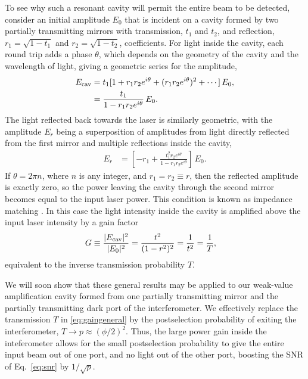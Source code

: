 To see why such a resonant cavity will permit the entire beam to be detected, consider an initial amplitude $E_0$ that is incident on a cavity formed by two partially transmitting mirrors with transmission, $t_1$ and $t_2$, and reflection, $r_1 = \sqrt{1-t_1}$ and $r_2 = \sqrt{1-t_2}$, coefficients.  For light inside the cavity, each round trip adds a phase $\theta$, which depends on the geometry of the cavity and the wavelength of light, giving a geometric series for the amplitude,
\begin{align}\label{eq:simplecavityamplitude}
\nonumber E_{\rm cav}&= t_1[1 + r_1 r_2 e^{i\theta} + (r_1 r_2 e^{i\theta})^2 + \cdots]\,E_0, \\
&=\frac{t_1}{1 - r_1 r_2 e^{i\theta}}\,E_0.
\end{align}   
The light reflected back towards the laser is similarly geometric, with the amplitude $E_r$ being a superposition of amplitudes from light directly reflected from the first mirror and multiple reflections inside the cavity,
\begin{align}\label{eq:simplecavityreflection}
E_{r} &= \left[-r_1 + \frac{t_1^2 r_2 e^{i\theta}}{1 - r_1 r_2 e^{i\theta}}\right]\,E_0.
\end{align}
If $\theta = 2\pi n$, where $n$ is any integer, and $r_1 = r_2 \equiv r$, then the reflected amplitude is exactly zero, so the power leaving the cavity through the second mirror becomes equal to the input laser power.  This condition is known as impedance matching \cite{Schnier1997}.  In this case the light intensity inside the cavity is amplified above the input laser intensity by a gain factor 
\begin{align}\label{eq:gaingeneral}
 G &\equiv \frac{|E_{\rm cav}|^2}{|E_0|^2} = \frac{t^2}{(1 - r^2)^2} = \frac{1}{t^2} = \frac{1}{T},
\end{align}   
equivalent to the inverse transmission probability $T$.  

We will soon show that these general results may be applied to our weak-value amplification cavity formed from one partially transmitting mirror and the partially transmitting dark port of the interferometer. We effectively replace the transmission $T$ in \eqref{eq:gaingeneral} by the postselection probability of exiting the interferometer, $T \rightarrow p \approx (\phi/2)^2$.  Thus, the large power gain inside the inteferometer allows for the small postselection probability to give the entire input beam out of one port, and no light out of the other port, boosting the SNR of Eq.~\eqref{eq:snr} by $1/\sqrt{p}$. 

